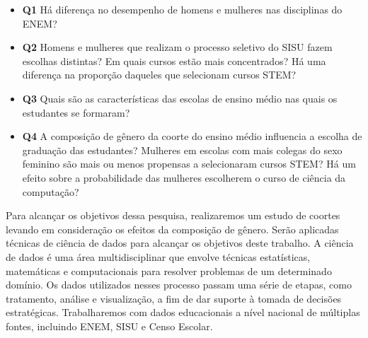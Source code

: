 \begin{itemize}
  \item \textbf{Q1} Há diferença no desempenho de homens e mulheres nas disciplinas do ENEM?
  \item \textbf{Q2} Homens e mulheres que realizam o processo seletivo do SISU fazem escolhas distintas? Em quais cursos estão mais concentrados? Há uma diferença na proporção daqueles que selecionam cursos STEM?
  \item \textbf{Q3} Quais são as características das escolas de ensino médio nas quais os estudantes se formaram?
  \item \textbf{Q4} A composição de gênero da coorte do ensino médio influencia a escolha de graduação das estudantes? Mulheres em escolas com mais colegas do sexo feminino são mais ou menos propensas a selecionaram cursos STEM? Há um efeito sobre a probabilidade das mulheres escolherem o curso de ciência da computação?
\end{itemize}

Para alcançar os objetivos dessa pesquisa, realizaremos um estudo de coortes levando em consideração os efeitos da composição de gênero. Serão aplicadas técnicas de ciência de dados para alcançar os objetivos deste trabalho. A ciência de dados é uma área multidisciplinar que envolve técnicas estatísticas, matemáticas e computacionais para resolver problemas de um determinado domínio. Os dados utilizados nesses processo passam uma série de etapas, como tratamento, análise e visualização, a fim de dar suporte à tomada de decisões estratégicas. Trabalharemos com dados educacionais a nível nacional de múltiplas fontes, incluindo ENEM, SISU e Censo Escolar.


